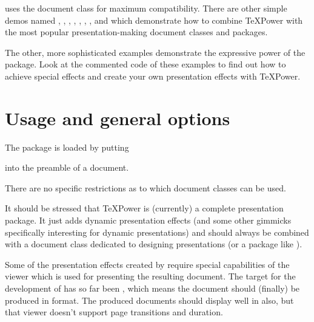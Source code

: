 \begin{slide}
 uses the  document class for maximum
compatibility. There are other simple demos named
, , ,
, , ,
, and 
which demonstrate how to combine \TeX Power with the
most popular presentation-making document classes and packages.

\newslide

The other, more sophisticated examples demonstrate the expressive power of the
 package. Look at the commented code of these examples to find out how to achieve special effects and
create your own presentation effects with \TeX Power.

\newslide

%
\section{Usage and general options}
The  package is loaded by putting
\begin{center}
\end{center}
into the preamble of a document.

There are no specific restrictions as to which document classes can be used.

It should be stressed that \TeX Power is  (currently) a complete presentation package. It just adds dynamic
presentation effects (and some other gimmicks specifically interesting for dynamic presentations) and should always be
combined with a document class dedicated to designing presentations (or a package like
\href{ftp://ftp.dante.de/tex-archive/help/Catalogue/entries/pdfslide.html}{}).

Some of the presentation effects created by  require special capabilities of the viewer which is used for
presenting the resulting document. The target for the development of  has so far been
\href{http://www.adobe.com/products/acrobat/readermain.html}%
{}, which means the
document should (finally) be produced in  format. The produced
 documents should display well in
\href{http://www.cs.wisc.edu/~ghost/gsview/}{} also, but that
viewer doesn't support page transitions and duration.


\end{slide}
